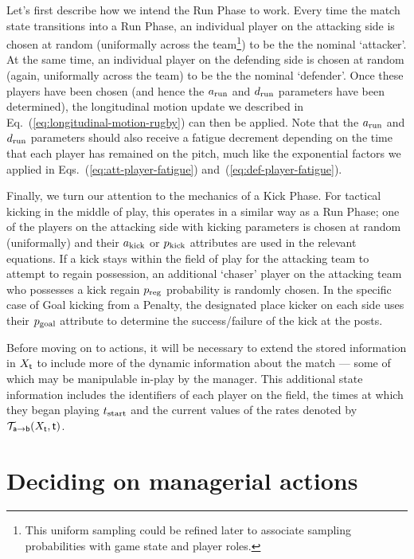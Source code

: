 Let's first describe how we intend the {\sf Run Phase} to work. Every time the match state transitions into a {\sf Run Phase}, an individual player on the attacking side is chosen at random (uniformally across the team\footnote{This uniform sampling could be refined later to associate sampling probabilities with game state and player roles.}) to be the the nominal `attacker'. At the same time, an individual player on the defending side is chosen at random (again, uniformally across the team) to be the the nominal `defender'. Once these players have been chosen (and hence the $a_{\rm run}$ and $d_{\rm run}$ parameters have been determined), the longitudinal motion update we described in Eq.~(\ref{eq:longitudinal-motion-rugby}) can then be applied. Note that the $a_{\rm run}$ and $d_{\rm run}$ parameters should also receive a fatigue decrement depending on the time that each player has remained on the pitch, much like the exponential factors we applied in Eqs.~(\ref{eq:att-player-fatigue}) and~(\ref{eq:def-player-fatigue}).

Finally, we turn our attention to the mechanics of a {\sf Kick Phase}. For tactical kicking in the middle of play, this operates in a similar way as a {\sf Run Phase}; one of the players on the attacking side with kicking parameters is chosen at random (uniformally) and their $a_{\rm kick}$ or $p_{\rm kick}$ attributes are used in the relevant equations. If a kick stays within the field of play for the attacking team to attempt to regain possession, an additional `chaser' player on the attacking team who possesses a kick regain $p_{\rm reg}$ probability is randomly chosen. In the specific case of {\sf Goal} kicking from a {\sf Penalty}, the designated place kicker on each side uses their $p_{\rm goal}$ attribute to determine the success/failure of the kick at the posts.

Before moving on to actions, it will be necessary to extend the stored information in $X_{{\sf t}}$ to include more of the dynamic information about the match --- some of which may be manipulable in-play by the manager. This additional state information includes the identifiers of each player on the field, the times at which they began playing $t_{\rm start}$ and the current values of the rates denoted by ${\cal T}_{{\sf a}\rightarrow {\sf b}}(X_{{\sf t}},{\sf t})$.

\section{\sffamily Deciding on managerial actions}

